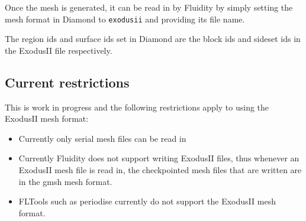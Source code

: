 Once the mesh is generated, it can be read in by Fluidity by simply setting the 
mesh format in Diamond to \texttt{exodusii} and providing its file name.

The region ids and surface ids set in Diamond are the block ids and sideset ids 
in the ExodusII file respectively. 


\subsection*{Current restrictions}
\label{ssec:exodusii_restrictions}

This is work in progress and the following restrictions apply to using the ExodusII 
mesh format:
\begin{itemize}
 \item Currently only serial mesh files can be read in
 \item Currently Fluidity does not support writing ExodusII files, thus whenever
 an ExodusII mesh file is read in, the checkpointed mesh files that are written are 
 in the gmsh mesh format.
 \item FLTools such as periodise currently do not support the ExodusII mesh format.

\end{itemize}

